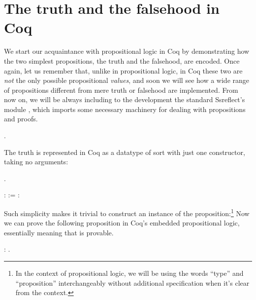 \section{The truth and the falsehood in Coq}




We start our acquaintance with propositional logic in Coq by
demonstrating how the two simplest propositions, the truth and the
falsehood, are encoded. Once again, let us remember that, unlike in
propositional logic, in Coq these two are \textit{not} the only possible
propositional \textit{values}, and soon we will see how a wide range of
propositions different from mere truth or falsehood are
implemented. From now on, we will be always including to the
development the standard Ssreflect's module ,
 which imports some necessary machinery for dealing
with propositions and proofs.


 \begin{coqdoccode}
\coqdocemptyline
\coqdocnoindent
{}    .\coqdoceol
\coqdocemptyline
\coqdocemptyline
\end{coqdoccode}


The truth is represented in Coq as a datatype of sort  with just
one constructor, taking no arguments:


\begin{coqdoccode}
\coqdocemptyline
\coqdocnoindent
{} .\coqdoceol
\coqdocemptyline
\end{coqdoccode}
\coqdoceol
\coqdocemptyline
\coqdocnoindent
{}  :  :=   : 

\coqdocemptyline




Such simplicity makes it trivial to construct an instance of the
 proposition:\footnote{In the context of propositional logic, we
will be using the words ``type'' and ``proposition'' interchangeably
without additional specification when it's clear from the context.}
Now we can prove the following proposition in Coq's embedded
propositional logic, essentially meaning that  is provable.


\begin{coqdoccode}
\coqdocemptyline
\coqdocnoindent
{} : .\coqdoceol
\coqdocemptyline
\end{coqdoccode}


